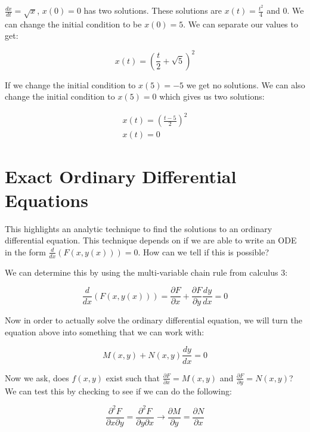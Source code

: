   \begin{problem}
    $\frac{dx}{dt}=\sqrt{x}$, $x(0)=0$ has two solutions. These solutions are $x(t)=\frac{t^2}{4}$ and $0$. We can change the initial condition to be $x(0)=5$. We can separate our values to get:

    \begin{equation}
      x(t) =\left(\frac{t}{2} + \sqrt{5}\right)^2
    \end{equation}
    
    If we change the initial condition to $x(5)=-5$ we get no solutions. We can also change the initial condition to $x(5)=0$ which gives us two solutions:

    \begin{align}
      x(t) =\left(\frac{t - 5}{2}\right)^2\\
      x(t) = 0
    \end{align}
  \end{problem}

\section{Exact Ordinary Differential Equations}

  This highlights an analytic technique to find the solutions to an ordinary differential equation. This technique depends on if we are able to write an ODE in the form $\frac{d}{dx}(F(x,y(x)))=0$. How can we tell if this is possible? 

    We can determine this by using the multi-variable chain rule from calculus 3:

    \begin{equation}
      \frac{d}{dx}(F(x,y(x))) = \frac{\partial F}{\partial x} + \frac{\partial F}{\partial y} \frac{dy}{dx} = 0 
    \end{equation}

    Now in order to actually solve the ordinary differential equation, we will turn the equation above into something that we can work with:

    \begin{equation}
      M(x,y) + N(x,y)\frac{dy}{dx} = 0
    \end{equation}

    Now we ask, does $f(x,y)$ exist such that $\frac{\partial F}{\partial x} =  M(x,y)$ and $\frac{\partial F}{\partial y} = N(x,y)$? We can test this by checking to see if we can do the following:

    \begin{equation}
      \frac{\partial^2F}{\partial x\partial y}=\frac{\partial^2 F}{\partial y\partial x}\rightarrow\boxed{\frac{\partial M}{\partial y}=\frac{\partial N}{\partial x}}
    \end{equation}

